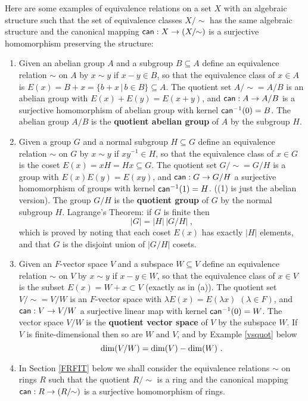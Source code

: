 \documentclass[11pt]{amsbook}
\theoremstyle{definition}
\begin{document}
Here are some examples of equivalence relations on a set $X$ with an algebraic structure such that the set of equivalence classes $X/\!\!\sim$ has the same algebraic structure and the canonical mapping
 ${\sf can}: X \to (X/\!\!\sim)$ is a surjective homomorphism preserving the structure:
 \begin{enumerate}
 \item Given an abelian group $A$ and a subgroup $B\subseteq A$ define an equivalence relation
 $\sim$ on $A$ by $x \sim y$ if $x-y \in B$, so that the equivalence class of $x \in A$ is
 $E(x)=B+x=\{b+x \,\vert\, b \in B\} \subseteq A$. The quotient set $A/\!\!\sim=A/B$ is
 an abelian group with $E(x)+E(y)=E(x+y)$, and  ${\sf can}: A \to A/B$ is a surjective homomorphism of abelian group with kernel ${\sf can}^{-1}(0)=B$. The abelian group $A/B$ is the {\bf quotient abelian group} of $A$ by the subgroup $H$.
 \item Given a group $G$ and a normal subgroup $H\subseteq G$ define an equivalence relation
 $\sim$ on $G$ by $x \sim y$ if $xy^{-1}\in H$, so that the equivalence class of $x \in G$ is
 the coset  $E(x)=xH=Hx \subseteq G$. The quotient set $G/\!\!\sim=G/H$ is
 a group with $E(x)E(y)=E(xy)$, and  ${\sf can}: G \to G/H$ a surjective homomorphism of groups
 with kernel ${\sf can}^{-1}(1)=H$.  ((1) is just the abelian version).
 The group $G/H$ is the {\bf quotient group} of $G$ by the normal subgroup $H$.
  Lagrange's Theorem: if $G$ is finite then
 $$\vert G \vert = \vert H \vert \,\vert G/H\vert~,$$
 which is proved by noting that  each coset $E(x)$ has exactly $\vert H \vert$ elements, and that $G$ is the disjoint union of $\vert G/H\vert$ cosets.
 \item   Given an $F$-vector space $V$ and a subspace $W \subseteq V$ define an equivalence relation
 $\sim$ on $V$ by $x \sim y$ if $x-y \in W$, so that the equivalence class of $x \in V$ is
 the subset $E(x)=W+x \subset V$ (exactly as in (a)). The quotient set $V/\!\!\sim=V/W$ is
 an $F$-vector space with $\lambda E(x)=E(\lambda x)$ $(\lambda \in F)$, and  ${\sf can}: V \to V/W$ a surjective linear map with kernel ${\sf can}^{-1}(0)=W$.
 The vector space $V/W$ is the {\bf quotient vector space} of $V$ by the subspace $W$.
   If $V$ is finite-dimensional then so are $W$ and $V$, and by Example \ref{vsquot} below
 $${\rm dim}(V/W)={\rm dim}(V)-{\rm dim}(W)~.$$
 \item In Section \ref{FRFIT} below we shall consider the equivalence relations $\sim$ on rings $R$
 such that the quotient $R/\!\!\sim$ is a ring and the canonical mapping
 ${\sf can}: R \to (R/\!\!\sim)$ is a surjective homomorphism of rings.
 \end{enumerate}
\end{document}
